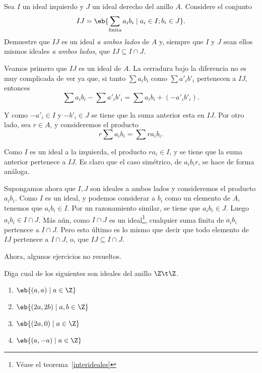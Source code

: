 \begin{ejer}
	Sea $I$ un ideal izquierdo y $J$ un ideal derecho del anillo $A$. Considere el conjunto
	\[ IJ = \eb{\sum_{\text{finita}} a_ib_i \mid a_i\in I; b_i\in J}. \]
	Demuestre que $IJ$ es un ideal \textit{a ambos lados} de $A$ y, siempre que $I$ y $J$ sean ellos mismos ideales \textit{a ambos lados}, que $IJ \subseteq I \cap J$.
\end{ejer}
\begin{sol}
	Veamos primero que $IJ$ es un ideal de $A$. La cerradura bajo la diferencia no es muy complicada de ver ya que, si tanto $\sum a_ib_i$ como $\sum a'_ib'_i$ pertenecen a $IJ$, entonces
	\[ \sum a_ib_i - \sum a'_ib'_i = \sum a_ib_i + (- a'_ib'_i). \]
	
	Y como $-a'_i\in I$ y $-b'_i\in J$ se tiene que la suma anterior esta en $IJ$. Por otro lado, sea $r\in A$, y consideremos el producto
	\[ r\sum a_ib_i = \sum ra_ib_i. \]
	
	Como $I$ es un ideal a la izquierda, el producto $ra_i\in I$, y se tiene que la suma anterior pertenece a $IJ$. Es claro que el caso simétrico, de $a_ib_ir$, se hace de forma análoga. 
	
	Supongamos ahora que $I,J$ son ideales a ambos lados y consideremos el producto $a_ib_i$. Como $I$ es un ideal, y podemos considerar a $b_i$ como un elemento de $A$, tenemos que $a_ib_i\in I$. Por un razonamiento similar, se tiene que $a_ib_i \in J$. Luego $a_ib_i \in I \cap J$. Más aún, como $I\cap J$ es un ideal\footnote{Véase el teorema~\ref{interideales}}, cualquier suma finita de $a_ib_i$ pertenece a $I\cap J$. Pero esto último es lo mismo que decir que todo elemento de $IJ$ pertenece a $I\cap J$, o, que $IJ \subseteq I\cap J$.  
\end{sol}
Ahora, algunos ejercicios no resueltos.
\begin{ejer}
	Diga cual de los siguientes son ideales del anillo $ \Z\t \Z $.
	\begin{enumerate}
		\item $\eb{(a,a)\mid a\in \Z}$
		\item $ \eb{(2a,2b)\mid a,b\in \Z} $
		\item $ \eb{(2a,0)\mid a\in \Z} $
		\item $ \eb{(a,-a)\mid a\in \Z} $
	\end{enumerate}
\end{ejer}

\clearpage
